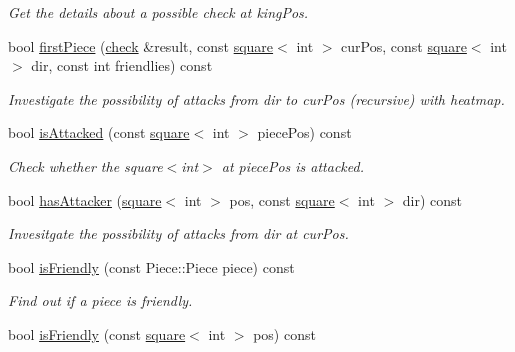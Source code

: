 \begin{DoxyCompactItemize}
\begin{DoxyCompactList}\small\item\em Get the details about a possible check at king\+Pos. \end{DoxyCompactList}\item 
bool \hyperlink{classBoard_a900420865c9acc6a18a9e25f94e3b72e}{first\+Piece} (\hyperlink{structcheck}{check} \&result, const \hyperlink{structsquare}{square}$<$ int $>$ cur\+Pos, const \hyperlink{structsquare}{square}$<$ int $>$ dir, const int friendlies) const
\begin{DoxyCompactList}\small\item\em Investigate the possibility of attacks from dir to cur\+Pos (recursive) with heatmap. \end{DoxyCompactList}\item 
\mbox{\label{classBoard_ae8183cabc093c8bd030250c42959fa37}} 
bool \hyperlink{classBoard_ae8183cabc093c8bd030250c42959fa37}{is\+Attacked} (const \hyperlink{structsquare}{square}$<$ int $>$ piece\+Pos) const
\begin{DoxyCompactList}\small\item\em Check whether the square$<$int$>$ at piece\+Pos is attacked. \end{DoxyCompactList}\item 
bool \hyperlink{classBoard_a8b9245cb469f2e82c23ac49edd412646}{has\+Attacker} (\hyperlink{structsquare}{square}$<$ int $>$ pos, const \hyperlink{structsquare}{square}$<$ int $>$ dir) const
\begin{DoxyCompactList}\small\item\em Invesitgate the possibility of attacks from dir at cur\+Pos. \end{DoxyCompactList}\item 
\mbox{\label{classBoard_a5068575e721428ee78754984813713e5}} 
bool \hyperlink{classBoard_a5068575e721428ee78754984813713e5}{is\+Friendly} (const Piece\+::\+Piece piece) const
\begin{DoxyCompactList}\small\item\em Find out if a piece is friendly. \end{DoxyCompactList}\item 
\mbox{\label{classBoard_a33b5e15eeeba65612ad3005ff5e60690}} 
bool \hyperlink{classBoard_a33b5e15eeeba65612ad3005ff5e60690}{is\+Friendly} (const \hyperlink{structsquare}{square}$<$ int $>$ pos) const

\end{DoxyCompactItemize}
